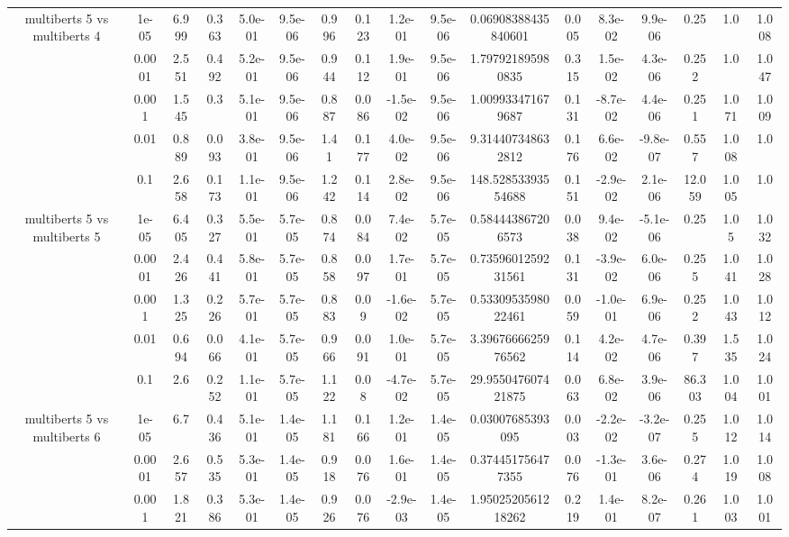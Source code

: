 \begin{tabular}{|c|c|c|c|c|c|c|c|c|c|c|c|c|c|c|c|c|}
\hline
\multirow{5}{*}{multiberts 5 vs multiberts 4} & 1e-05 & 6.999 & 0.363 & 5.0e-01 & 9.5e-06 & 0.996 & 0.123 & 1.2e-01 & 9.5e-06 & 0.06908388435840601 & 0.005 & 8.3e-02 & 9.9e-06 & 0.25 & 1.0 & 1.008 \\
 & 0.0001 & 2.551 & 0.492 & 5.2e-01 & 9.5e-06 & 0.944 & 0.112 & 1.9e-01 & 9.5e-06 & 1.797921895980835 & 0.315 & 1.5e-02 & 4.3e-06 & 0.252 & 1.0 & 1.047 \\
 & 0.001 & 1.545 & 0.3 & 5.1e-01 & 9.5e-06 & 0.887 & 0.086 & -1.5e-02 & 9.5e-06 & 1.009933471679687 & 0.131 & -8.7e-02 & 4.4e-06 & 0.251 & 1.071 & 1.009 \\
 & 0.01 & 0.889 & 0.093 & 3.8e-01 & 9.5e-06 & 1.41 & 0.177 & 4.0e-02 & 9.5e-06 & 9.314407348632812 & 0.176 & 6.6e-02 & -9.8e-07 & 0.557 & 1.008 & 1.0 \\
 & 0.1 & 2.658 & 0.173 & 1.1e-01 & 9.5e-06 & 1.242 & 0.114 & 2.8e-02 & 9.5e-06 & 148.52853393554688 & 0.151 & -2.9e-02 & 2.1e-06 & 12.059 & 1.005 & 1.0 \\
\hline
\multirow{5}{*}{multiberts 5 vs multiberts 5} & 1e-05 & 6.405 & 0.327 & 5.5e-01 & 5.7e-05 & 0.874 & 0.084 & 7.4e-02 & 5.7e-05 & 0.584443867206573 & 0.038 & 9.4e-02 & -5.1e-06 & 0.25 & 1.05 & 1.032 \\
 & 0.0001 & 2.426 & 0.441 & 5.8e-01 & 5.7e-05 & 0.858 & 0.097 & 1.7e-01 & 5.7e-05 & 0.7359601259231561 & 0.131 & -3.9e-02 & 6.0e-06 & 0.255 & 1.041 & 1.028 \\
 & 0.001 & 1.325 & 0.226 & 5.7e-01 & 5.7e-05 & 0.883 & 0.09 & -1.6e-02 & 5.7e-05 & 0.5330953598022461 & 0.059 & -1.0e-01 & 6.9e-06 & 0.252 & 1.043 & 1.012 \\
 & 0.01 & 0.694 & 0.066 & 4.1e-01 & 5.7e-05 & 0.966 & 0.091 & 1.0e-01 & 5.7e-05 & 3.3967666625976562 & 0.114 & 4.2e-02 & 4.7e-06 & 0.397 & 1.535 & 1.024 \\
 & 0.1 & 2.6 & 0.252 & 1.1e-01 & 5.7e-05 & 1.122 & 0.08 & -4.7e-02 & 5.7e-05 & 29.955047607421875 & 0.063 & 6.8e-02 & 3.9e-06 & 86.303 & 1.004 & 1.001 \\
\hline
\multirow{5}{*}{multiberts 5 vs multiberts 6} & 1e-05 & 6.7 & 0.436 & 5.1e-01 & 1.4e-05 & 1.181 & 0.166 & 1.2e-01 & 1.4e-05 & 0.03007685393095 & 0.003 & -2.2e-02 & -3.2e-07 & 0.255 & 1.012 & 1.014 \\
 & 0.0001 & 2.657 & 0.535 & 5.3e-01 & 1.4e-05 & 0.918 & 0.076 & 1.6e-01 & 1.4e-05 & 0.374451756477355 & 0.076 & -1.3e-01 & 3.6e-06 & 0.274 & 1.019 & 1.008 \\
 & 0.001 & 1.821 & 0.386 & 5.3e-01 & 1.4e-05 & 0.926 & 0.076 & -2.9e-03 & 1.4e-05 & 1.9502520561218262 & 0.219 & 1.4e-01 & 8.2e-07 & 0.261 & 1.003 & 1.001 \\

\end{tabular}
